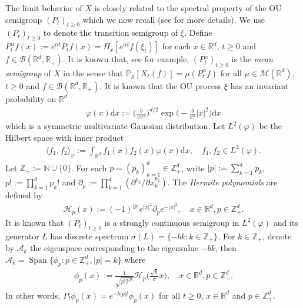 \documentclass[12pt,a4paper]{amsart}
\theoremstyle{plain}
\theoremstyle{definition}
\numberwithin{equation}{section}
\begin{document}
The limit behavior of $X$  is closely related to the spectral property of the OU semigroup $(P_t)_{t\geq 0}$ which we now recall (see \cite{MetafunePallaraPriola2002Spectrum} for more details).
We use  $(P_t)_{t\geq 0}$ to denote the transition semigroup of $\xi$.	
Define
\(
P^{\alpha}_t f(x)
  := e^{\alpha t} P_t f(x)
  = \Pi_x [e^{\alpha t}f(\xi_t)]
\)
for each $x\in \mathbb R^d$, $t\geq 0$ and $f\in \mathcal B(\mathbb R^d, \mathbb R_+)$.
It is known that, see \cite[Proposition 2.27]{Li2011Measure-valued} for example, $(P^\alpha_t)_{t\geq 0}$ is the \emph{mean semigroup} of $X$ in the sense that
\(
  \mathbb{P}_{\mu}[X_t (f)]  = \mu( P^\alpha_t f)
\)
for all $\mu\in \mathcal M(\mathbb R^d)$, $t\geq 0$ and $f\in \mathcal B(\mathbb R^d, \mathbb R_+)$.
It is known that the OU process $\xi$ has an invariant probability on $\mathbb R^d$
\begin{align}
  \varphi(x)\mathrm dx
  :=\Big (\frac{b}{\pi \sigma^2}\Big )^{d/2}\exp \Big(-\frac{b}{\sigma^2}|x|^2 \Big)\mathrm dx
\end{align}
which is a symmetric multivariate Gaussian distribution.
Let $L^2(\varphi)$ be the Hilbert space with inner product
\begin{align}
  \langle f_1, f_2 \rangle_{\varphi}
  := \int_{\mathbb R^d}f_1(x)f_2(x)\varphi(x) \mathrm dx, \quad f_1,f_2 \in L^2(\varphi).
\end{align}
Let $\mathbb Z_+ := \mathbb N\cup\{0\}$.
For each $p = (p_k)_{k = 1}^d \in \mathbb{Z}_+^{d}$, write $|p|:=\sum_{k=1}^d p_k$, $p!:= \prod_{k= 1}^d p_k!$ and $\partial_p:= \prod_{k = 1}^d(\partial^{p_k}/\partial x_k^{p_k})$.
The \emph{Hermite polynomials} are defined by
\begin{align}
  \mathcal H_p(x)
  :=(-1)^{|p|}e^{|x|^2} \partial_p e^{-|x|^2}
  , \quad x\in \mathbb R^d, p \in \mathbb{Z}_+^{d}.
\end{align}
It is known that $(P_t)_{t\geq 0}$ is a strongly continuous semigroup in $L^2(\varphi)$ and its generator $L$ has discrete spectrum $\sigma(L)= \{-bk: k \in \mathbb Z_+\}$.
For $k \in \mathbb Z_+$, denote by $\mathcal{A}_k$ the eigenspace corresponding to the eigenvalue $-bk$, then $ \mathcal{A}_k = \operatorname{Span} \{\phi_p : p\in \mathbb Z_+^d, |p|=k\}$ where
\begin{align}
  \phi_p(x)
  := \frac{1}{\sqrt{ p! 2^{|p|} }} \mathcal H_p \Big(\frac{ \sqrt{b} }{\sigma}x \Big)
  , \quad x\in \mathbb R^d, p\in \mathbb Z_+^d.
\end{align}
In other words,
\(
  P_t\phi_p(x)
  = e^{-b|p|t}\phi_p(x)
\)
for all $t\geq 0$, $x\in \mathbb R^d$ and $p\in \mathbb Z_+^d$.
\end{document}
